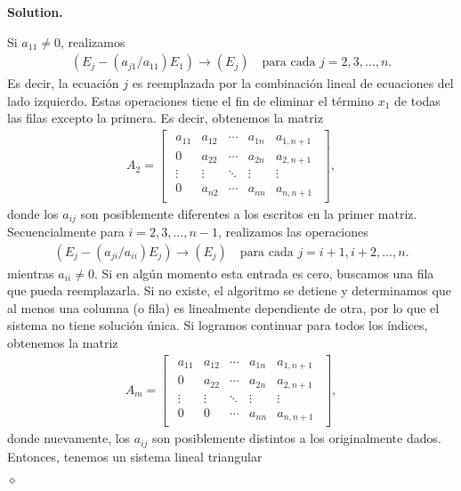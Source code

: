 \documentclass{article}
\theoremstyle{problemstyle}
\newenvironment{solution}{%
  \begin{mdframed}[linewidth=0.8pt,linecolor=Gray,backgroundcolor=Gray!5,roundcorner=5pt]%
  \noindent\textbf{Solution.}%
}{%
\hfill $ \diamond $ 
  \end{mdframed}%
}
\begin{document}
\begin{solution}
  Si $ a_{11} \neq 0 $, realizamos \cite{Burden2017}
	\begin{align*}
		(E_j - (a_{j1}/a_{11})E_1) \to (E_j)\quad \text{para cada } j = 2,3,\dots,n.
	\end{align*}
	Es decir, la ecuaci\'on $ j $ es reemplazada por la combinaci\'on lineal de ecuaciones del lado izquierdo.
	Estas operaciones tiene el fin de eliminar el t\'ermino $ x_1 $ de todas las filas excepto la primera. Es decir, obtenemos la matriz
	\begin{align*} A_2 =
		\begin{bmatrix}
			\begin{array}{cccc|c}
				a_{11} & a_{12} & \cdots & a_{1n} & a_{1,n+1} \\
				0      & a_{22} & \cdots & a_{2n} & a_{2,n+1} \\
				\vdots & \vdots & \ddots & \vdots & \vdots    \\
				0      & a_{n2} & \cdots & a_{nn} & a_{n,n+1}
			\end{array}
		\end{bmatrix},
	\end{align*}
	donde los $ a_{ij} $ son posiblemente diferentes a los escritos en la primer matriz. Secuencialmente para $ i = 2,3,\dots, n-1 $, realizamos las operaciones
	\begin{align*}
		(E_j - (a_{ji}/a_{ii})E_j) \to (E_j)\quad \text{para cada } j = i+1, i+2,\dots, n.
	\end{align*}
	mientras $ a_{ii}\neq 0 $. Si en alg\'un momento esta entrada es cero, buscamos una fila que pueda reemplazarla. Si no existe, el algoritmo se detiene y determinamos que al menos una columna (o fila) es linealmente dependiente de otra, por lo que el sistema no tiene soluci\'on \'unica. Si logramos continuar para todos los \'indices, obtenemos la matriz
	\begin{align*} A_m =
		\begin{bmatrix}
			\begin{array}{cccc|c}
				a_{11} & a_{12} & \cdots & a_{1n} & a_{1,n+1} \\
				0      & a_{22} & \cdots & a_{2n} & a_{2,n+1} \\
				\vdots & \vdots & \ddots & \vdots & \vdots    \\
				0      & 0      & \cdots & a_{nn} & a_{n,n+1}
			\end{array}
		\end{bmatrix},
	\end{align*}
	donde nuevamente, los $ a_{ij} $ son posiblemente distintos a los originalmente dados. Entonces, tenemos un sistema lineal triangular

\end{solution}
\end{document}
